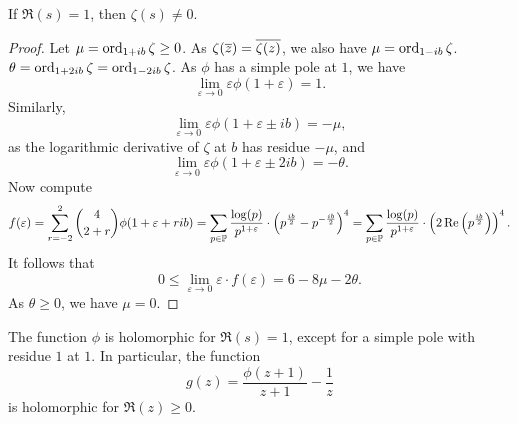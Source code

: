 \begin{izrek}
If $\Re(s) = 1$, then $\zeta(s) \ne 0$.
\end{izrek}

\begin{proof}
Let $\mu = \operatorname{ord}_{1 + ib} \zeta \geq 0$. As
$\zeta(\overline{z}) = \overline{\zeta(z)}$, we also have
$\mu = \operatorname{ord}_{1 - ib} \zeta$.
$\theta = \operatorname{ord}_{1 + 2ib} \zeta = \operatorname{ord}_{1 - 2ib} \zeta$. As $\phi$
has a simple pole at $1$, we have
\[
\lim_{\varepsilon \to 0} \varepsilon \phi(1+\varepsilon) = 1.
\]
Similarly,
\[
\lim_{\varepsilon \to 0} \varepsilon \phi(1 + \varepsilon \pm ib) =
-\mu,
\]
as the logarithmic derivative of $\zeta$ at $b$ has residue $-\mu$,
and
\[
\lim_{\varepsilon \to 0}
\varepsilon \phi(1 + \varepsilon \pm 2ib) =
-\theta.
\]
Now compute
\[
f(\varepsilon) =
\sum_{r=-2}^2 \binom{4}{2+r} \phi(1 + \varepsilon + rib) =
\sum_{p \in \mathbb{P}} \frac{\log(p)}{p^{1+\varepsilon}} \cdot
\left(p^{\frac{ib}{2}} - p^{-\frac{ib}{2}}\right)^4 =
\sum_{p \in \mathbb{P}} \frac{\log(p)}{p^{1+\varepsilon}} \cdot
\left(2 \operatorname{Re} \left(p^{\frac{ib}{2}}\right)\right)^4.
\]
It follows that
\[
0 \leq
\lim_{\varepsilon \to 0} \varepsilon \cdot f(\varepsilon) =
6 - 8 \mu - 2 \theta.
\]
As $\theta \geq 0$, we have $\mu = 0$.
\end{proof}

\begin{posledica}
The function $\phi$ is holomorphic for $\Re(s) = 1$, except for a
simple pole with residue $1$ at $1$. In particular, the function
\[
g(z) = \frac{\phi(z+1)}{z+1} - \frac{1}{z}
\]
is holomorphic for $\Re(z) \geq 0$.
\end{posledica}
